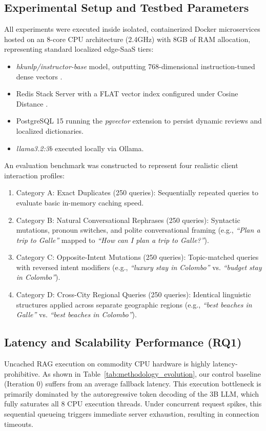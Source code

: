 \documentclass{ieeeaccess}
\begin{document}
\subsection{Experimental Setup and Testbed Parameters}
All experiments were executed inside isolated, containerized Docker microservices hosted on an 8-core CPU architecture (2.4GHz) with 8GB of RAM allocation, representing standard localized edge-SaaS tiers:
\begin{itemize}
    \item \emph{hkunlp/instructor-base} model, outputting 768-dimensional instruction-tuned dense vectors \cite{reimers-sbert-2019}.
    \item Redis Stack Server with a FLAT vector index configured under Cosine Distance \cite{bang-gptcache-2023, biton-exact-hits-2025}.
    \item  PostgreSQL 15 running the \emph{pgvector} extension to persist dynamic reviews and localized dictionaries.
    \item  \emph{llama3.2:3b} executed locally via Ollama.
\end{itemize}

An evaluation benchmark was constructed to represent four realistic client interaction profiles:
\begin{enumerate}
    \item {Category A: Exact Duplicates} (250 queries): Sequentially repeated queries to evaluate basic in-memory caching speed.
    \item {Category B: Natural Conversational Rephrases} (250 queries): Syntactic mutations, pronoun switches, and polite conversational framing (e.g., \emph{``Plan a trip to Galle''} mapped to \emph{``How can I plan a trip to Galle?''}).
    \item {Category C: Opposite-Intent Mutations} (250 queries): Topic-matched queries with reversed intent modifiers (e.g., \emph{``luxury stay in Colombo''} vs. \emph{``budget stay in Colombo''}).
    \item {Category D: Cross-City Regional Queries} (250 queries): Identical linguistic structures applied across separate geographic regions (e.g., \emph{``best beaches in Galle''} vs. \emph{``best beaches in Colombo''}).
\end{enumerate}

\subsection{Latency and Scalability Performance (RQ1)}
Uncached RAG execution on commodity CPU hardware is highly latency-prohibitive. As shown in Table~\ref{tab:methodology_evolution}, our control baseline (Iteration 0) suffers from an average fallback latency. This execution bottleneck is primarily dominated by the autoregressive token decoding of the 3B LLM, which fully saturates all 8 CPU execution threads. Under concurrent request spikes, this sequential queueing triggers immediate server exhaustion, resulting in connection timeouts.
\end{document}
